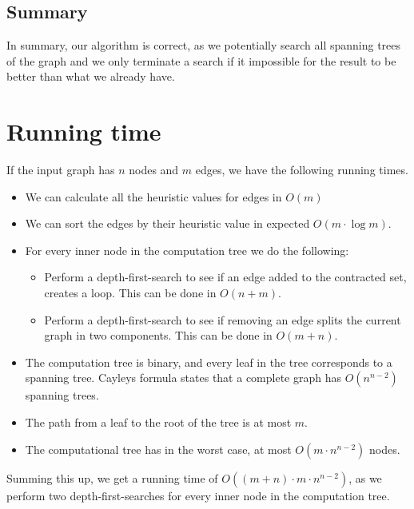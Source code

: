 \subsection{Summary}
In summary, our algorithm is correct, as we potentially search all spanning trees of the graph and we only terminate a search if it impossible for the result to be better than what we already have.


\section{Running time}
If the input graph has $n$ nodes and $m$ edges, we have the following running times.

\begin{itemize}
\item We can calculate all the heuristic values for edges in $O(m)$

\item We can sort the edges by their heuristic value in expected $O(m\cdot \log m)$.

\item For every inner node in the computation tree we do the following:
\begin{itemize}
\item Perform a depth-first-search to see if an edge added to the contracted set, creates a loop. This can be done in $O(n+m)$.

\item Perform a depth-first-search to see if removing an edge splits the current graph in two components. This can be done in $O(m+n)$.
\end{itemize}

\item The computation tree is binary, and every leaf in the tree corresponds to a spanning tree. Cayleys formula states that a complete graph has $O(n^{n-2})$ spanning trees.

\item The path from a leaf to the root of the tree is at most $m$.

\item The computational tree has in the worst case, at most $O(m\cdot n^{n-2})$ nodes.
\end{itemize}

Summing this up, we get a running time of $O((m+n)\cdot m\cdot n^{n-2})$, as we perform two depth-first-searches for every inner node in the computation tree.